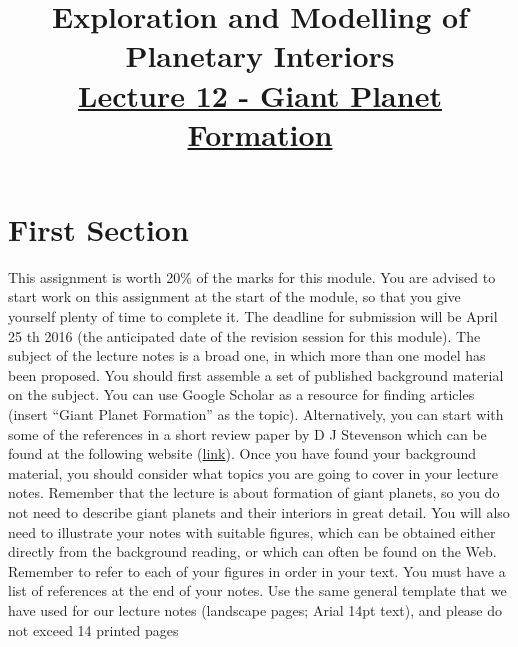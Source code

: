 \documentclass[12pt]{article} %
\title{\large{\vspace{-5ex}\textbf{Exploration and Modelling of Planetary Interiors}}\newline\\{\textbf{\underline{Lecture 12 - Giant Planet Formation}}}\vspace{-7ex}}
\author{}
\date{} %
\begin{document}
\begingroup
\let\center\flushleft
\let\endcenter\endflushleft
\maketitle
\endgroup

\begingroup
\let\cleardoublepage\relax
\let\clearpage\relax
\tableofcontents
\endgroup

\section{First Section}\vspace{-2ex}\titlerule[1pt]\bigskip

This assignment is worth 20\% of the marks for this module. You are
advised to start work on this assignment at the start of the module, so
that you give yourself plenty of time to complete it. The deadline for
submission will be April 25 th 2016 (the anticipated date of the revision
session for this module).\newline\linebreak
The subject of the lecture notes is a broad one, in which more than one
model has been proposed. You should first assemble a set of published
background material on the subject. You can use Google Scholar as a
resource for finding articles (insert “Giant Planet Formation” as the
topic). Alternatively, you can start with some of the references in a short
review paper by D J Stevenson which can be found at the following
website (\href{http://authors.library.caltech.edu/9922/1/STEaipcp04.pdf}{link}).\newline \linebreak
Once you have found your background material, you should consider
what topics you are going to cover in your lecture notes. Remember that
the lecture is about formation of giant planets, so you do not need to
describe giant planets and their interiors in great detail. You will also
need to illustrate your notes with suitable figures, which can be obtained
either directly from the background reading, or which can often be found
on the Web. Remember to refer to each of your figures in order in your
text. You must have a list of references at the end of your notes.\newline\linebreak
Use the same general template that we have used for our lecture notes
(landscape pages; Arial 14pt text), and please do not exceed 14 printed
pages
\end{document}
